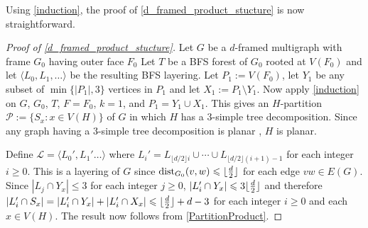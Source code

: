 \documentclass{patmorin}
\theoremstyle{plain}
\theoremstyle{definition}
\newcommand{\note}[2]{\noindent{\color{red}[#1:~#2]}}
\DeclareMathOperator{\dist}{dist}
\DeclarePairedDelimiter{\floor}{\lfloor}{\rfloor}
\renewcommand{\ge}{\geqslant}
\renewcommand{\le}{\leqslant}
\begin{document}
Using \cref{induction}, the proof of \cref{d_framed_product_stucture} is now straightforward.


\begin{proof}[Proof of \cref{d_framed_product_stucture}]
	Let $G$ be a $d$-framed multigraph with frame $G_0$ having outer face $F_0$
  Let $T$ be a BFS forest of $G_0$ rooted at $V(F_0)$ and let $\langle L_0,L_1,\ldots\rangle$ be the resulting BFS layering.  Let $P_1:= V(F_0)$, let $Y_1$ be any subset of $\min\{|P_1|,3\}$ vertices in $P_1$ and let $X_1:=P_1\setminus Y_1$.  Now apply \cref{induction} on $G$, $G_0$, $T$, $F=F_0$, $k=1$, and $P_1=Y_1\cup X_1$.
    This gives an $H$-partition $\mathcal{P}:=\{S_x:x\in V(H)\}$ of $G$ in which $H$ has a $3$-simple tree decomposition.  Since any graph having a $3$-simple tree decomposition is planar \cite{knauer.ueckerdt:simple,kratochvil.vaner:note,elmallah.colbourn:on}, $H$ is planar.

	Define $\mathcal{L}=\langle L_0',L_1'\ldots\rangle$ where $L_i'=L_{\lfloor d/2\rfloor i}\cup \cdots \cup L_{\lfloor d/2\rfloor(i+1)-1}$ for each integer $i\ge 0$. This is a layering of $G$ since $\dist_{G_0}(v,w)\le \floor{ \frac{d}{2} }$ for each edge $vw\in E(G)$.  Since $|L_j\cap Y_x|\le 3$ for each integer $j\ge 0$, $|L_i'\cap Y_x|\le 3\floor{\frac{d}{2}}$ and therefore $|L_i'\cap S_x|= |L_i'\cap Y_x|+ |L_i'\cap X_x|\le \floor{ \frac{d}{2}} + d -3$ for each integer $i\ge 0$ and each $x\in V(H)$. The result now follows from \cref{PartitionProduct}.
\end{proof}
\end{document}
